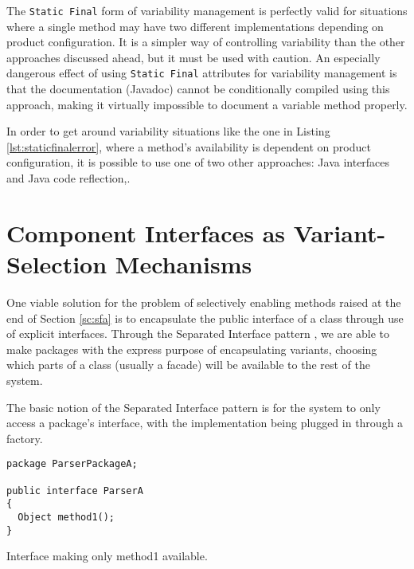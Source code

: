 The \lstinline{Static Final} form of \gls{variability} management is perfectly valid for situations where a single method may have two different implementations depending on product configuration. It is a simpler way of controlling \gls{variability} than the other approaches discussed ahead, but it must be used with caution. An especially dangerous effect of using \lstinline{Static Final} attributes for \gls{variability} management is that the documentation (Javadoc) cannot be conditionally compiled using this approach, making it virtually impossible to document a variable method properly.

In order to get around \gls{variability} situations like the one in Listing \ref{lst:staticfinalerror}, where a method's availability is dependent on product configuration, it is possible to use one of two other approaches: Java interfaces and Java code reflection,.


\section{Component Interfaces as Variant-Selection Mechanisms}
\label{sc:interfaces}

One viable solution for the problem of selectively enabling methods raised at the end of Section \ref{sc:sfa} is to encapsulate the public interface of a class through use of explicit interfaces. Through the Separated Interface pattern \cite{FOWLER:2002}, we are able to make packages with the express purpose of encapsulating \gls{variant}s, choosing which parts of a class (usually a facade) will be available to the rest of the system.

The basic notion of the Separated Interface pattern is for the system to only access a package's interface, with the implementation being plugged in through a factory.

\begin{listing}
\begin{verbatim}
package ParserPackageA;

public interface ParserA
{
  Object method1();
}
\end{verbatim}
\caption{Interface making only method1 available.} \label{lst:interface1}
\end{listing}

